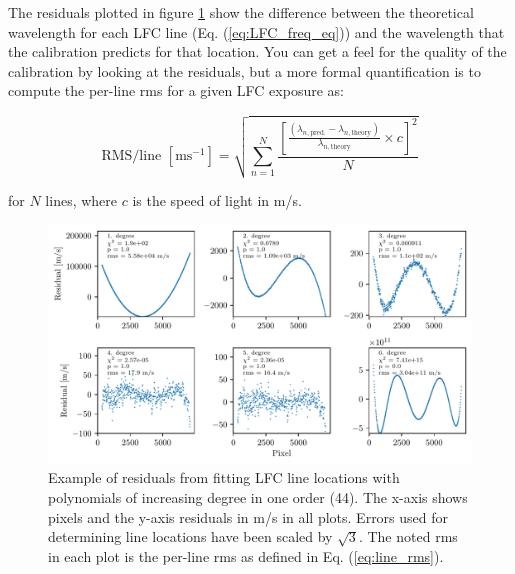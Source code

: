     The residuals plotted in figure \ref{fig:LFC_calib_poly_degrees} show the difference between the theoretical wavelength for each LFC line (Eq. (\ref{eq:LFC_freq_eq})) and the wavelength that the calibration predicts for that location. You can get a feel for the quality of the calibration by looking at the residuals, but a more formal quantification is to compute the per-line rms for a given LFC exposure as: 
    
    \vspace{0.15cm}

    \begin{equation}        
        \text{RMS/line } [\text{ms}^{-1}] = \sqrt{\sum_{n=1}^{N} \frac{\left[\frac{\left(\lambda_{n, \text {pred.}}-\lambda_{n, \text {theory}}\right)}{\lambda_{n,\text{theory}}} \times c\right]^{2}}{N}}
        \label{eq:line_rms}
    \end{equation}
    
    \vspace{0.25cm}

    for $N$ lines, where $c$ is the speed of light in m/s.
    
    \begin{figure}%
        \begin{wide}  
            \includegraphics[width=\textwidth]{figures/calib/calib_poly_fit_degrees_order44_residuals_ang.pdf}
            \caption{Example of residuals from fitting LFC line locations with polynomials of increasing degree in one order (44). The x-axis shows pixels and the y-axis residuals in m/s in all plots. Errors used for determining line locations have been scaled by $\sqrt{3}$. The noted rms in each plot is the per-line rms as defined in Eq. (\ref{eq:line_rms}).}
            \label{fig:LFC_calib_poly_degrees}
        \end{wide}
    \end{figure}

